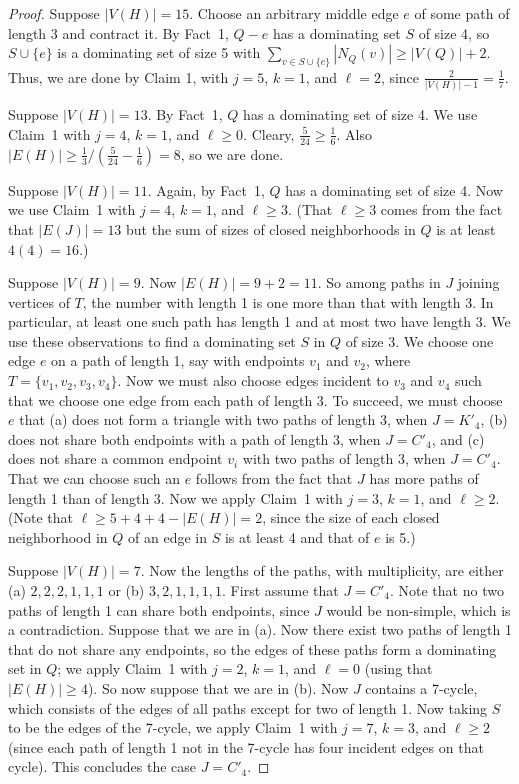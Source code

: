 \documentclass[12pt]{amsart}
\theoremstyle{plain}
\theoremstyle{definition}
\theoremstyle{remark}
\begin{document}
\begin{proof}
Suppose $|V(H)|=15$.  Choose an arbitrary middle edge $e$ of some path of length
3 and contract it. By Fact~1, $Q-e$ has a dominating set $S$ of size 4, so
$S\cup\{e\}$ is a dominating set of size 5 with $\sum_{v\in
S\cup\{e\}}|N_Q(v)|\ge |V(Q)|+2$.  Thus, we are done by Claim 1, with $j=5$,
$k=1$, and $\ell=2$, since $\frac2{|V(H)|-1}=\frac17$.

Suppose $|V(H)|=13$.  By Fact~1, $Q$ has a dominating set of size 4.
We use Claim~1 with $j=4$, $k=1$, and $\ell\ge 0$.  Cleary, $\frac5{24}\ge
\frac16$.  Also $|E(H)|\ge \frac13/(\frac{5}{24}-\frac16)=8$, so we are
done.

Suppose $|V(H)|=11$. Again, by Fact~1, $Q$ has a dominating set of size 4.
Now we use Claim~1 with $j=4$, $k=1$, and $\ell\ge 3$.
(That $\ell\ge3$ comes from the fact that $|E(J)|=13$ but the sum of sizes
of closed neighborhoods in $Q$ is at least $4(4)=16$.)  

Suppose $|V(H)|=9$.
Now $|E(H)|=9+2=11$. So among paths in $J$ joining vertices of $T$, the number
with length 1 is one more than that with length 3.  In particular, at least one
such path has length 1 and at most two have length 3.
We use these observations to find a dominating set $S$ in $Q$ of size 3.
We choose one edge $e$ on a path of length 1, say with endpoints $v_1$ and $v_2$,
where $T=\{v_1,v_2,v_3,v_4\}$.  Now we must also choose edges incident to $v_3$
and $v_4$ such that we choose one edge from each path of length 3.  To succeed,
we must choose $e$ that (a) does not form a triangle with two paths of length 3,
when $J=K'_4$, (b) does not share both endpoints with a path of length 3, when
$J=C'_4$, and (c) does not share a common endpoint $v_i$ with two paths of
length 3, when $J=C'_4$.  That we can choose such an $e$ follows from the fact
that $J$ has more paths of length 1 than of length 3.  Now we apply Claim~1 with
$j=3$, $k=1$, and $\ell\ge 2$.  (Note that $\ell\ge 5+4+4-|E(H)|=2$, since the
size of each closed neighborhood in $Q$ of an edge in $S$ is at least 4 and that
of $e$ is 5.)

Suppose $|V(H)|=7$.  Now the lengths of the paths, with multiplicity, are either
(a) $2,2,2,1,1,1$ or (b) $3,2,1,1,1,1$.  First assume that $J=C'_4$.  
Note that no two paths of length 1 can share both endpoints, since $J$ would be
non-simple, which is a contradiction.  
Suppose that we are in (a).  Now there
exist two paths of length 1 that do not share any
endpoints, so the edges of these paths form a dominating set in $Q$; we
apply Claim~1 with $j=2$, $k=1$, and $\ell=0$ (using that $|E(H)|\ge 4$).
So now suppose that we are in (b).  Now $J$ contains a 7-cycle, which consists
of the edges of all paths except for two of length 1.  Now taking $S$ to be the
edges of the 7-cycle, we apply Claim~1 with $j=7$, $k=3$, and $\ell\ge 2$
(since each path of length 1 not in the 7-cycle has four incident edges on that
cycle).  This concludes the case $J=C'_4$.


\end{proof}
\end{document}
